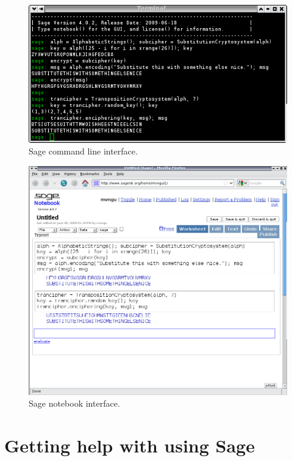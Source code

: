 \begin{figure}[!htpb]
\centering
\includegraphics[scale=0.5]{figures/sage-cmd}
\caption{Sage command line interface.}
\label{fig:sage_cmd_interfaces}
\end{figure}

\begin{figure}[!htpb]
\centering
\includegraphics[scale=0.4]{figures/sage-gui}
\caption{Sage notebook interface.}
\label{fig:sage_gui_interfaces}
\end{figure}

\newpage

\section*{Getting help with using Sage}

